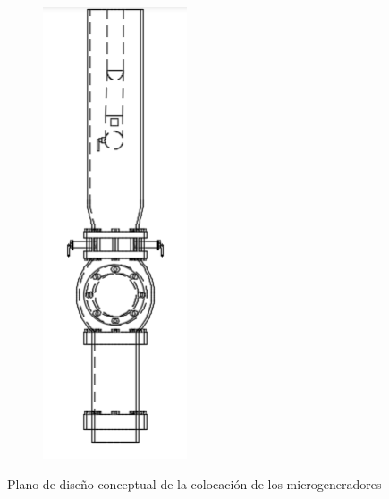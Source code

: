 \documentclass[11pt]{article}
\begin{document}
\begin{figure}[htbp]
\begin{subfigure}{0.4\linewidth}
        \end{subfigure}
        \begin{subfigure}{0.15\linewidth}
            \centering
            \includegraphics[width=\linewidth]{img/DisenoSub3.png}
        \end{subfigure} 

        \caption{Plano de diseño conceptual de la colocación de los microgeneradores}
    \end{figure}
\end{document}

